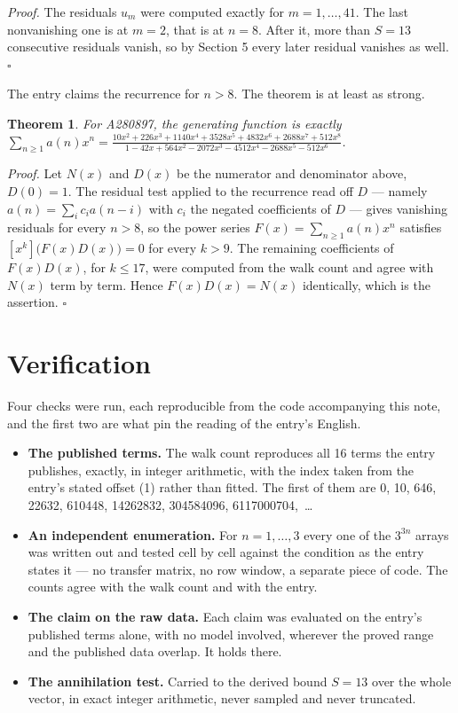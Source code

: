 \documentclass[11pt]{article}
\newtheorem{theorem}{Theorem}
\theoremstyle{definition}
\begin{document}
{\itshape Proof.} The residuals $u_m$ were computed exactly for $m = 1,\dots,41$. The last nonvanishing one is at $m = 2$, that is at $n = 8$. After it, more than $S = 13$ consecutive residuals vanish, so by Section 5 every later residual vanishes as well. $\square$

The entry claims the recurrence for $n > 8$. The theorem is at least as strong.

\begin{theorem} For A280897, the generating function is exactly $\sum_{n\ge 1} a(n)x^n = \frac{10x^{2} + 226x^{3} + 1140x^{4} + 3528x^{5} + 4832x^{6} + 2688x^{7} + 512x^{8}}{1 - 42x + 564x^{2} - 2072x^{3} - 4512x^{4} - 2688x^{5} - 512x^{6}}$.\end{theorem}

{\itshape Proof.} Let $N(x)$ and $D(x)$ be the numerator and denominator above, $D(0)=1$. The residual test applied to the recurrence read off $D$ --- namely $a(n) = \sum_i c_i a(n-i)$ with $c_i$ the negated coefficients of $D$ --- gives vanishing residuals for every $n > 8$, so the power series $F(x)=\sum_{n\ge 1}a(n)x^n$ satisfies $[x^k]\bigl(F(x)D(x)\bigr) = 0$ for every $k > 9$. The remaining coefficients of $F(x)D(x)$, for $k \le 17$, were computed from the walk count and agree with $N(x)$ term by term. Hence $F(x)D(x) = N(x)$ identically, which is the assertion. $\square$

\section{Verification}

Four checks were run, each reproducible from the code accompanying this note, and the first two are what pin the reading of the entry's English.

\begin{itemize}

\item {\bfseries The published terms.} The walk count reproduces all 16 terms the entry publishes, exactly, in integer arithmetic, with the index taken from the entry's stated offset (1) rather than fitted. The first of them are 0, 10, 646, 22632, 610448, 14262832, 304584096, 6117000704,~\dots

\item {\bfseries An independent enumeration.} For $n = 1,\dots,3$ every one of the $3^{3n}$ arrays was written out and tested cell by cell against the condition as the entry states it --- no transfer matrix, no row window, a separate piece of code. The counts agree with the walk count and with the entry.

\item {\bfseries The claim on the raw data.} Each claim was evaluated on the entry's published terms alone, with no model involved, wherever the proved range and the published data overlap. It holds there.

\item {\bfseries The annihilation test.} Carried to the derived bound $S = 13$ over the whole vector, in exact integer arithmetic, never sampled and never truncated.

\end{itemize}
\end{document}
